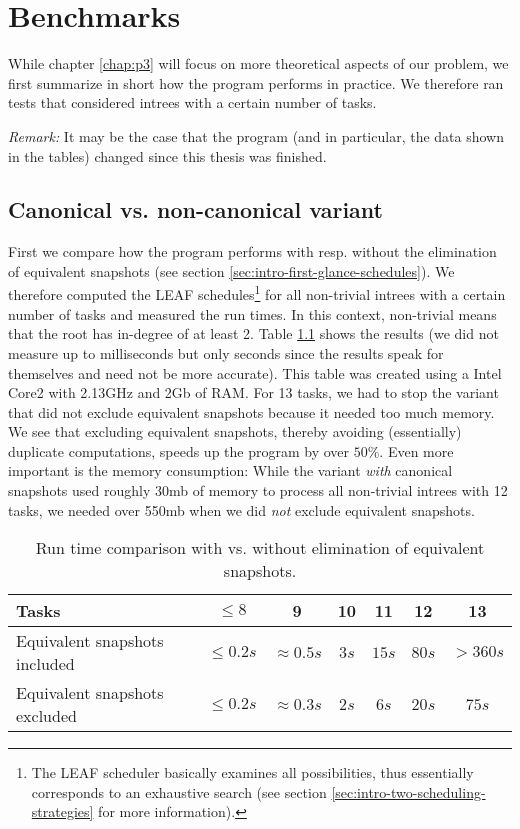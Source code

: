 \chapter{Benchmarks}
\label{chap:benchmarks}

While chapter \ref{chap:p3} will focus on more theoretical aspects of our problem, we first summarize in short how the program performs in practice. We therefore ran tests that considered intrees with a certain number of tasks.

\emph{Remark:} It may be the case that the program (and in particular, the data shown in the tables) changed since this thesis was finished.

\section{Canonical vs. non-canonical variant}
\label{sec:benchmark-canonical-vs-non-canonical}

First we compare how the program performs with resp. without the elimination of equivalent snapshots (see section \ref{sec:intro-first-glance-schedules}). We therefore computed the LEAF schedules\footnote{The LEAF scheduler basically examines all possibilities, thus essentially corresponds to an exhaustive search (see section \ref{sec:intro-two-scheduling-strategies} for more information).} for all non-trivial intrees with a certain number of tasks and measured the run times. In this context, non-trivial means that the root has in-degree of at least 2. Table \ref{tab:comparison-canonical-vs-non-canonical} shows the results (we did not measure up to milliseconds but only seconds since the results speak for themselves and need not be more accurate). This table was created using a Intel Core2 with 2.13GHz and 2Gb of RAM. For 13 tasks, we had to stop the variant that did not exclude equivalent snapshots because it needed too much memory. We see that excluding equivalent snapshots, thereby avoiding (essentially) duplicate computations, speeds up the program by over $50\%$.
Even more important is the memory consumption: While the variant \emph{with} canonical snapshots used roughly 30mb of memory to process all non-trivial intrees with 12 tasks, we needed over 550mb when we did \emph{not} exclude equivalent snapshots.

\begin{table}[th]
  \centering
  \begin{tabular}[ht]{lcccccc}
    Tasks                         & $\leq 8$    & 9 & 10 & 11 & 12 & 13 \\
    \hline
    Equivalent snapshots included & $\leq 0.2s$ & $\approx 0.5s$ & $3s$ & $15s$ & $80s$ & $>360s$ \\
    Equivalent snapshots excluded & $\leq 0.2s$ & $\approx 0.3s$ & $2s$ & $6s$ & $20s$ & $75s$
  \end{tabular}
  \caption{Run time comparison with vs. without elimination of equivalent snapshots.}
  \label{tab:comparison-canonical-vs-non-canonical}
\end{table}

